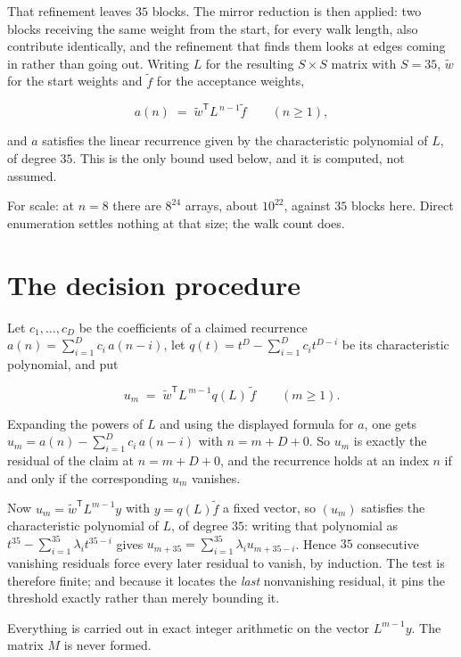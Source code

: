 \documentclass[11pt]{article}
\theoremstyle{definition}
\begin{document}
That refinement leaves $35$ blocks. The mirror reduction is then applied: two blocks receiving the same weight from the start, for every walk length, also contribute identically, and the refinement that finds them looks at edges coming in rather than going out. Writing $L$ for the resulting $S \times S$ matrix with $S = 35$, $\tilde w$ for the start weights and $\tilde f$ for the acceptance weights,

\[a(n) \;=\; \tilde w^{\mathsf T} L^{\,n-1} \tilde f \qquad (n \ge 1),\]

and $a$ satisfies the linear recurrence given by the characteristic polynomial of $L$, of degree $35$. This is the only bound used below, and it is computed, not assumed.

For scale: at $n = 8$ there are $8^{24}$ arrays, about $10^{22}$, against $35$ blocks here. Direct enumeration settles nothing at that size; the walk count does.

\section{The decision procedure}

Let $c_1,\dots,c_D$ be the coefficients of a claimed recurrence $a(n) = \sum_{i=1}^{D} c_i\,a(n-i)$, let $q(t) = t^{D} - \sum_{i=1}^{D} c_i t^{D-i}$ be its characteristic polynomial, and put

\[u_m \;=\; \tilde w^{\mathsf T} L^{\,m-1} q(L)\,\tilde f \qquad (m \ge 1).\]

Expanding the powers of $L$ and using the displayed formula for $a$, one gets $u_m = a(n) - \sum_{i=1}^{D} c_i\,a(n-i)$ with $n = m + D + 0$. So $u_m$ is exactly the residual of the claim at $n = m + D + 0$, and the recurrence holds at an index $n$ if and only if the corresponding $u_m$ vanishes.

Now $u_m = \tilde w^{\mathsf T} L^{m-1} y$ with $y = q(L)\tilde f$ a fixed vector, so $(u_m)$ satisfies the characteristic polynomial of $L$, of degree $35$: writing that polynomial as $t^{35} - \sum_{i=1}^{35} \lambda_i t^{35-i}$ gives $u_{m+35} = \sum_{i=1}^{35} \lambda_i u_{m+35-i}$. Hence $35$ consecutive vanishing residuals force every later residual to vanish, by induction. The test is therefore finite; and because it locates the {\itshape last} nonvanishing residual, it pins the threshold exactly rather than merely bounding it.

Everything is carried out in exact integer arithmetic on the vector $L^{m-1}y$. The matrix $M$ is never formed.
\end{document}
